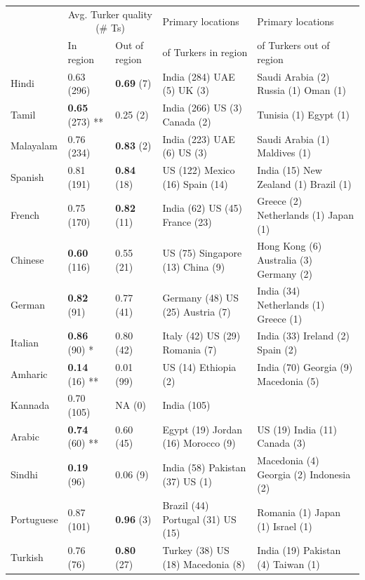 \documentclass[11pt]{article}
\begin{document}
\begin{table}
\scriptsize
\begin{center}
\begin{tabular}{lllll}
\hline\hline
&\multicolumn{2}{c}{Avg. Turker quality (\# Ts)}&Primary locations&Primary locations\\
&In region&Out of region&of Turkers in region&of Turkers out of region\\
\hline\hline
Hindi & 0.63 (296) & \textbf{0.69} (7) & India (284) UAE (5) UK (3)  & Saudi Arabia (2) Russia (1) Oman (1) \\
Tamil & \textbf{0.65} (273) ** & 0.25 (2) & India (266) US (3) Canada (2)  & Tunisia (1) Egypt (1)  \\
Malayalam & 0.76 (234) & \textbf{0.83} (2) & India (223) UAE (6) US (3)  & Saudi Arabia (1) Maldives (1) \\
Spanish & 0.81 (191) & \textbf{0.84} (18) & US (122) Mexico (16) Spain (14)  & India (15) New Zealand (1) Brazil (1) \\
French & 0.75 (170) & \textbf{0.82} (11) & India (62) US (45) France (23)  & Greece (2) Netherlands (1) Japan (1) \\
Chinese & \textbf{0.60} (116) & 0.55 (21) & US (75) Singapore (13) China (9)  & Hong Kong (6) Australia (3) Germany (2)  \\
German & \textbf{0.82} (91) & 0.77 (41) & Germany (48) US (25) Austria (7)  & India (34) Netherlands (1) Greece (1)  \\
Italian & \textbf{0.86} (90) * & 0.80 (42) & Italy (42) US (29) Romania (7)  & India (33) Ireland (2) Spain (2)  \\
Amharic & \textbf{0.14} (16) ** & 0.01 (99) & US (14) Ethiopia (2)  & India (70) Georgia (9) Macedonia (5)  \\
Kannada & 0.70 (105) & NA (0) & India (105)  & \\
Arabic & \textbf{0.74} (60) ** & 0.60 (45) & Egypt (19) Jordan (16) Morocco (9)  & US (19) India (11) Canada (3)  \\
Sindhi & \textbf{0.19} (96) & 0.06 (9) & India (58) Pakistan (37) US (1)  & Macedonia (4) Georgia (2) Indonesia (2)  \\
Portuguese & 0.87 (101) & \textbf{0.96} (3) & Brazil (44) Portugal (31) US (15)  & Romania (1) Japan (1) Israel (1) \\
Turkish & 0.76 (76) & \textbf{0.80} (27) & Turkey (38) US (18) Macedonia (8)  & India (19) Pakistan (4) Taiwan (1) \\

\end{tabular}
\end{center}
\end{table}
\end{document}
